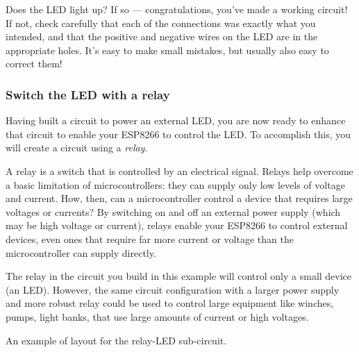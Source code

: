 Does the LED light up? If so --- congratulations, you’ve made a working circuit!
If not, check carefully that each of the connections was exactly what you intended, and that the positive and negative wires on the LED are in the appropriate holes.
It’s easy to make small mistakes, but usually also easy to correct them!


\subsubsection{\howto Switch the LED with a relay}

Having built a circuit to power an external LED, you are now ready to enhance that circuit to enable your ESP8266 to control the LED.
To accomplish this, you will create a circuit using a \emph{relay}.

A relay is a switch that is controlled by an electrical signal.
Relays help overcome a basic limitation of microcontrollers: they can supply only low levels of voltage and current.
How, then, can a microcontroller control a device that requires large voltages or currents?
By switching on and off an external power supply (which may be high voltage or current), relays enable your ESP8266 to control external devices, even ones that require far more current or voltage than the microcontroller can supply directly.

The relay in the circuit you build in this example will control only a small device (an LED).
However, the same circuit configuration with a larger power supply and more robust relay could be used to control large equipment like winches, pumps, light banks, \etc that use large amounts of current or high voltages.


\begin{marginfigure}[-0cm]
	\begin{center}
		\caption[Button/external LED layout]{An example of layout for the relay-LED sub-circuit. }
	\end{center}
\end{marginfigure}



